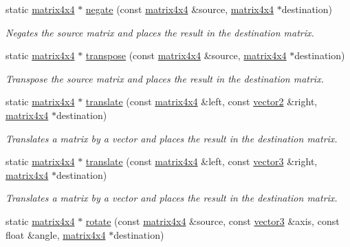 \begin{DoxyCompactItemize}
static \hyperlink{classflounder_1_1matrix4x4}{matrix4x4} $\ast$ \hyperlink{classflounder_1_1matrix4x4_a80dc993f606da9821e1c25b5e3da8b4b}{negate} (const \hyperlink{classflounder_1_1matrix4x4}{matrix4x4} \&source, \hyperlink{classflounder_1_1matrix4x4}{matrix4x4} $\ast$destination)
\begin{DoxyCompactList}\small\item\em Negates the source matrix and places the result in the destination matrix. \end{DoxyCompactList}\item 
static \hyperlink{classflounder_1_1matrix4x4}{matrix4x4} $\ast$ \hyperlink{classflounder_1_1matrix4x4_a8981485705d5383e78d47015617dc9ee}{transpose} (const \hyperlink{classflounder_1_1matrix4x4}{matrix4x4} \&source, \hyperlink{classflounder_1_1matrix4x4}{matrix4x4} $\ast$destination)
\begin{DoxyCompactList}\small\item\em Transpose the source matrix and places the result in the destination matrix. \end{DoxyCompactList}\item 
static \hyperlink{classflounder_1_1matrix4x4}{matrix4x4} $\ast$ \hyperlink{classflounder_1_1matrix4x4_abaf0f6c7678192584177a8778e3f29ab}{translate} (const \hyperlink{classflounder_1_1matrix4x4}{matrix4x4} \&left, const \hyperlink{classflounder_1_1vector2}{vector2} \&right, \hyperlink{classflounder_1_1matrix4x4}{matrix4x4} $\ast$destination)
\begin{DoxyCompactList}\small\item\em Translates a matrix by a vector and places the result in the destination matrix. \end{DoxyCompactList}\item 
static \hyperlink{classflounder_1_1matrix4x4}{matrix4x4} $\ast$ \hyperlink{classflounder_1_1matrix4x4_a454168535e88cdfffb8a54a8858a28cf}{translate} (const \hyperlink{classflounder_1_1matrix4x4}{matrix4x4} \&left, const \hyperlink{classflounder_1_1vector3}{vector3} \&right, \hyperlink{classflounder_1_1matrix4x4}{matrix4x4} $\ast$destination)
\begin{DoxyCompactList}\small\item\em Translates a matrix by a vector and places the result in the destination matrix. \end{DoxyCompactList}\item 
static \hyperlink{classflounder_1_1matrix4x4}{matrix4x4} $\ast$ \hyperlink{classflounder_1_1matrix4x4_a609091aacfd80ea7ad75dd1c4d14b837}{rotate} (const \hyperlink{classflounder_1_1matrix4x4}{matrix4x4} \&source, const \hyperlink{classflounder_1_1vector3}{vector3} \&axis, const float \&angle, \hyperlink{classflounder_1_1matrix4x4}{matrix4x4} $\ast$destination)

\end{DoxyCompactItemize}
